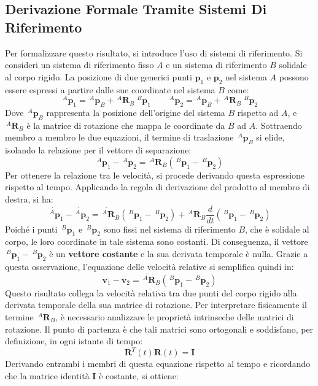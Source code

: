 ﻿\documentclass[11pt, a4paper]{article}
\begin{document}
\newpage
\subsection{Derivazione Formale Tramite Sistemi Di Riferimento}
Per formalizzare questo risultato, si introduce l'uso di sistemi di riferimento. Si consideri un sistema di riferimento fisso \(A\) e un sistema di riferimento \(B\) solidale al corpo rigido. La posizione di due generici punti \(\bm{p}_{1}\) e \(\bm{p}_{2}\) nel sistema \(A\) possono essere espressi a partire dalle sue coordinate nel sistema \(B\) come:
\[
    \,^{A}\bm{p}_1 = \,^{A}\bm{p}_B + \,^{A}\bm{R}_B \; ^{B}\bm{p}_1 \qquad \,^{A}\bm{p}_2 = \,^{A}\bm{p}_B + \,^{A}\bm{R}_B \; ^{B}{\bm{p}}_2
\]
Dove \(\,^{A}\bm{p}_B\) rappresenta la posizione dell'origine del sistema \(B\) rispetto ad \(A\), e \(\,^{A}\bm{R}_B\) è la matrice di rotazione che mappa le coordinate da \(B\) ad \(A\). Sottraendo membro a membro le due equazioni, il termine di traslazione \(\,^{A}\bm{p}_B\) si elide, isolando la relazione per il vettore di separazione:
\[
    \,^{A}\bm{p}_1 - \,^{A}\bm{p}_2 = \,^{A}\bm{R}_B \left(\,^{B}\bm{p}_1 - \,^{B}{\bm{p}}_2 \right)
\]
Per ottenere la relazione tra le velocità, si procede derivando questa espressione rispetto al tempo. Applicando la regola di derivazione del prodotto al membro di destra, si ha:
\[
    \dot{\,^{A}\bm{p}}_1 - \dot{\,^{A}\bm{p}}_2 = \dot{\,^{A}\bm{R}}_B \left( \,^{B}{\bm{p}}_1 - \,^{B}{\bm{p}}_2 \right) + \,^{A}\bm{R}_B \frac{d}{dt}\left( \,^{B}{\bm{p}}_1 - \,^{B}{\bm{p}}_2 \right)
\]
Poiché i punti \(\,^{B}{\bm{p}}_1\) e \(\,^{B}{\bm{p}}_2\) sono fissi nel sistema di riferimento \(B\), che è solidale al corpo, le loro coordinate in tale sistema sono costanti. Di conseguenza, il vettore \(\,^{B}{\bm{p}}_1 - \,^{B}{\bm{p}}_2\) è un \textbf{vettore costante} e la sua derivata temporale è nulla. Grazie a questa osservazione, l'equazione delle velocità relative si semplifica quindi in:
\[
    \bm{v}_1 - \bm{v}_2 = \dot{\,^{A}\bm{R}}_B \left( \,^{B}{\bm{p}}_1 - \,^{B}{\bm{p}}_2 \right)
\]
Questo risultato collega la velocità relativa tra due punti del corpo rigido alla derivata temporale della sua matrice di rotazione. Per interpretare fisicamente il termine \(\,^{A}\dot{\bm{R}}_B\), è necessario analizzare le proprietà intrinseche delle matrici di rotazione. Il punto di partenza è che tali matrici sono ortogonali e soddisfano, per definizione, in ogni istante di tempo:
\[
    \bm{R}^T(t) \bm{R}(t) = \bm{I}
\]
Derivando entrambi i membri di questa equazione rispetto al tempo e ricordando che la matrice identità \(\bm{I}\) è costante, si ottiene:
\end{document}
